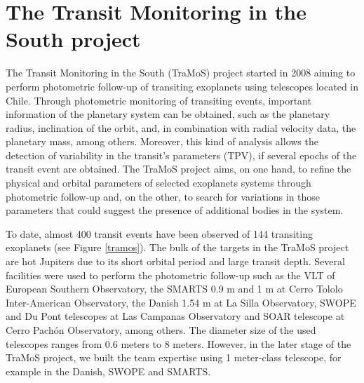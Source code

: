 \chapter{The Transit Monitoring in the South project}\label{chap:tramos}

The Transit Monitoring in the South (TraMoS) project started in 2008 aiming to perform photometric follow-up of transiting exoplanets using telescopes located in Chile.  Through photometric monitoring of transiting events, important information of the planetary system can be obtained, such as the planetary radius, inclination of the orbit, and, in combination with radial velocity data, the planetary mass, among others. Moreover, this kind of analysis allows the detection of variability in the transit's parameters (TPV), if several epochs of the transit event are obtained. The TraMoS project aims, on one hand, to refine the physical and orbital parameters of selected exoplanets systems through photometric follow-up and, on the other, to search for variations in those parameters that could suggest the presence of additional bodies in the system. 

To date, almost 400 transit events have been observed of 144 transiting exoplanets (see Figure \ref{tramos}). The bulk of the targets in the TraMoS project are hot Jupiters due to its short orbital period and large transit depth. Several facilities were used to perform the photometric follow-up such as the VLT of European Southern Observatory, the SMARTS 0.9 m and 1 m at Cerro Tololo Inter-American Observatory, the Danish 1.54 m at La Silla Observatory, SWOPE and Du Pont telescopes at Las Campanas Observatory and SOAR telescope at Cerro Pachón Observatory, among others. The diameter size of the used telescopes ranges from 0.6 meters to 8 meters. However, in the later stage of the TraMoS project, we built the team expertise using 1 meter-class telescope, for example in the Danish, SWOPE and SMARTS.


